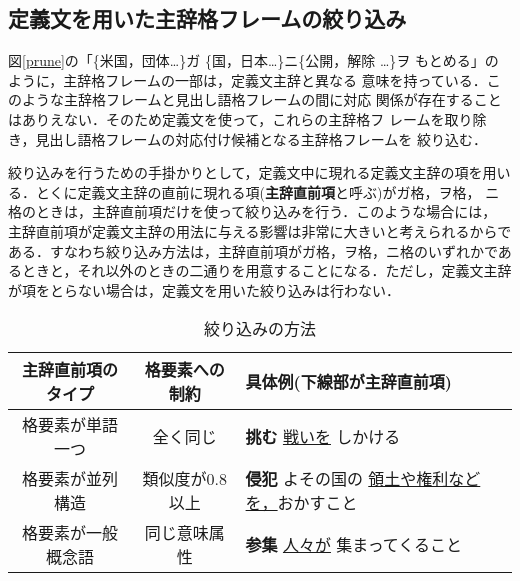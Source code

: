 \begin{figure*}
 \begin{center}
 \caption{格フレームの対応付け}
 \label{prune}
 \end{center}
\end{figure*}


\subsection{定義文を用いた主辞格フレームの絞り込み}

図\ref{prune}の「\{米国，団体\dots\}ガ \{国，日本\dots\}ニ\{公開，解除
\dots\}ヲ もとめる」のように，主辞格フレームの一部は，定義文主辞と異なる
意味を持っている．このような主辞格フレームと見出し語格フレームの間に対応
関係が存在することはありえない．そのため定義文を使って，これらの主辞格フ
レームを取り除き，見出し語格フレームの対応付け候補となる主辞格フレームを
絞り込む．

絞り込みを行うための手掛かりとして，定義文中に現れる定義文主辞の項を用い
る．とくに定義文主辞の直前に現れる項({\bf 主辞直前項}と呼ぶ)がガ格，ヲ格，
ニ格のときは，主辞直前項だけを使って絞り込みを行う．このような場合には，
主辞直前項が定義文主辞の用法に与える影響は非常に大きいと考えられるからで
ある．すなわち絞り込み方法は，主辞直前項がガ格，ヲ格，ニ格のいずれかであ
るときと，それ以外のときの二通りを用意することになる．ただし，定義文主辞
が項をとらない場合は，定義文を用いた絞り込みは行わない．


\begin{table}[h]
\caption{絞り込みの方法}
\label{puning}
\begin{center}
\begin{tabular}{ccl} \\ \hline
 主辞直前項のタイプ & 格要素への制約    & 具体例(下線部が主辞直前項) \\
 \hline
 格要素が単語一つ   & 全く同じ          & {\bf 挑む} \underline{戦いを}
 しかける   \\
  格要素が並列構造   & 類似度が0.8以上 & {\bf 侵犯} よその国の
 \underline{領土や権利などを，}おかすこと \\
  格要素が一般概念語 & 同じ意味属性     & {\bf 参集} \underline{人々が}
 集まってくること \\ \hline
\end{tabular}
\end{center}
\vspace{-20pt}
\end{table}


